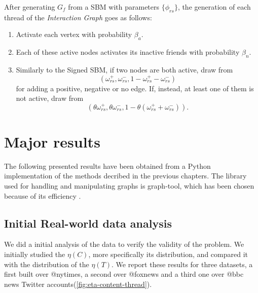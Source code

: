 \bigskip
After generating $G_f$ from a SBM with parameters $\{\phi_{rs} \}$, the
generation of each thread of the \emph{Interaction Graph} goes as
follows:

\begin{enumerate}
	\item Activate each vertex with probability $\beta_{a}  $.
	\item Each of these active nodes activates its inactive friends with
	      probability $\beta_n$.
	\item Similarly to the Signed SBM, if two nodes are both active, draw
	      from
	      \begin{equation*}
		      (\omega _{rs} ^{+}, \omega _{rs} ^{-}, 1 - \omega _{rs} ^{+} -
		      \omega _{rs} ^{-})
	      \end{equation*}
	      for adding a positive, negative or no edge. If, instead, at least one
	      of them is not active, draw from
	      \begin{equation*}
		      (\theta \omega _{rs} ^{+}, \theta \omega _{rs} ^{-}, 1
		      - \theta (\omega _{rs} ^{+} + \omega _{rs} ^{-})).
	      \end{equation*}
\end{enumerate}

\section{Major results}

The following presented results have been obtained from a Python
implementation of the methods decribed in the previous chapters. The library used
for handling and manipulating graphs is graph-tool, which has been chosen
because of its efficiency \cite{peixoto_graph-tool_2014}.

\subsection{Initial Real-world data analysis}%
\label{sub:validity_problem_definition}

We did a initial analysis of the data to verify the validity of the problem. We
initially studied the $\eta(C)$, more specifically its distribution, and
compared it with the distribution of the $\eta(T)$. We report these results for
three datasets, a first built over @nytimes, a second over @foxnews
and a third one over @bbc news Twitter accounts\footnotemark (\autoref{fig:eta-content-thread}).


